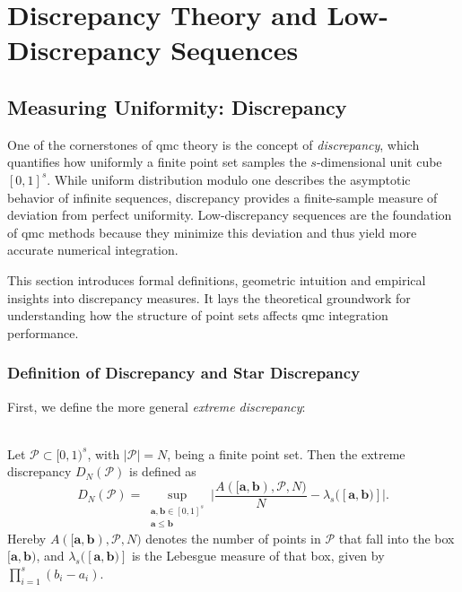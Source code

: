 \chapter{Discrepancy Theory and Low-Discrepancy Sequences}
\label{chapter2}

\section{Measuring Uniformity: Discrepancy}

One of the cornerstones of \ac{qmc} theory is the concept of \emph{discrepancy},
which quantifies how uniformly a finite point set samples the $s$-dimensional
unit cube $[0,1]^s$. While uniform distribution modulo one describes the
asymptotic behavior of infinite sequences, discrepancy provides a finite-sample
measure of deviation from perfect uniformity. Low-discrepancy sequences are the
foundation of \ac{qmc} methods because they minimize this deviation and thus
yield more accurate numerical integration.

This section introduces formal definitions, geometric intuition and empirical
insights into discrepancy measures. It lays the theoretical groundwork for
understanding how the structure of point sets affects \ac{qmc} integration
performance.

\subsection{Definition of Discrepancy and Star Discrepancy}

First, we define the more general \emph{extreme discrepancy}:

\begin{definition} \ \\
Let $\mathcal{P}\subset [0,1)^s$, with $|\mathcal{P}| = N$, being a finite point
set. Then the extreme discrepancy $D_N(\mathcal{P})$ is defined as
\begin{equation*}
    D_N(\mathcal{P}) = \sup\limits_{\substack{\boldsymbol{a,b} \in [0,1]^s \\ \boldsymbol{a} \leq \boldsymbol{b}}} \bigg| \frac{A([\boldsymbol{a},\boldsymbol{b}) , \mathcal{P}, N)}{N} - \lambda_s([\boldsymbol{a},\boldsymbol{b})] \bigg|.
\end{equation*}
Hereby $A([\boldsymbol{a},\boldsymbol{b}), \mathcal{P}, N)$ denotes the number
of points in $\mathcal{P}$ that fall into the box
$[\boldsymbol{a},\boldsymbol{b})$, and
$\lambda_s([\boldsymbol{a},\boldsymbol{b})]$ is the Lebesgue measure of that
box, given by $\prod_{i=1}^{s} (b_i - a_i)$.
\end{definition}

